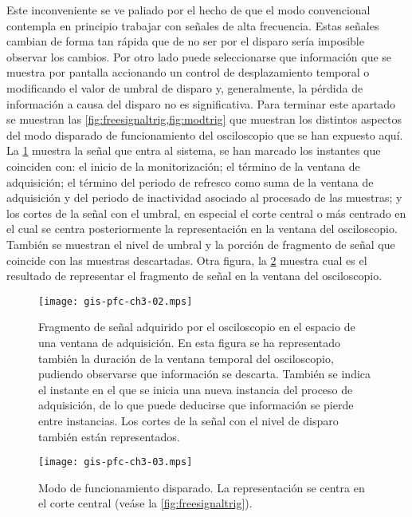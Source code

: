 Este inconveniente se ve paliado por el hecho de que el modo convencional contempla en principio trabajar con señales de alta frecuencia. Estas señales cambian de forma tan rápida que de no ser por el disparo sería imposible observar los cambios. Por otro lado puede seleccionarse que información que se muestra por pantalla accionando un control de desplazamiento temporal o modificando el valor de umbral de disparo y, generalmente, la pérdida de información a causa del disparo no es significativa.
Para terminar este apartado se muestran las \cref{fig:freesignaltrig,fig:modtrig} que muestran los distintos aspectos del modo disparado de funcionamiento del osciloscopio que se han expuesto aquí. La \cref{fig:freesignaltrig} muestra la señal que entra al sistema, se han marcado los instantes que coinciden con: el inicio de la monitorización; el término de la ventana de adquisición; el término del periodo de refresco como suma de la ventana de adquisición y del periodo de inactividad asociado al procesado de las muestras; y los cortes de la señal con el umbral, en especial el corte central o más centrado en el cual se centra posteriormente la representación en la ventana del osciloscopio. También se muestran el nivel de umbral y la porción de fragmento de señal que coincide con las muestras descartadas. Otra figura, la \cref{fig:modtrig} muestra cual es el resultado de representar el fragmento de señal en la ventana del osciloscopio.

\begin{figure}
	\begin{center}
		\texttt{[image: gis-pfc-ch3-02.mps]}
	\end{center}
	\caption[Fragmento de señal adquirido por el osciloscopio en el espacio de una ventana de adquisición]{Fragmento de señal adquirido por el osciloscopio en el espacio de una ventana de adquisición. En esta figura se ha representado también la duración de la ventana temporal del osciloscopio, pudiendo observarse que información se descarta. También se indica el instante en el que se inicia una nueva instancia del proceso de adquisición, de lo que puede deducirse que información se pierde entre instancias. Los cortes de la señal con el nivel de disparo también están representados.}
	\label{fig:freesignaltrig}
\end{figure}

\begin{figure}
	\begin{center}
		\texttt{[image: gis-pfc-ch3-03.mps]}
	\end{center}
	\caption[Modo de funcionamiento disparado]{Modo de funcionamiento disparado. La representación se centra en el corte central (veáse la \vref{fig:freesignaltrig}).}
	\label{fig:modtrig}
\end{figure}



